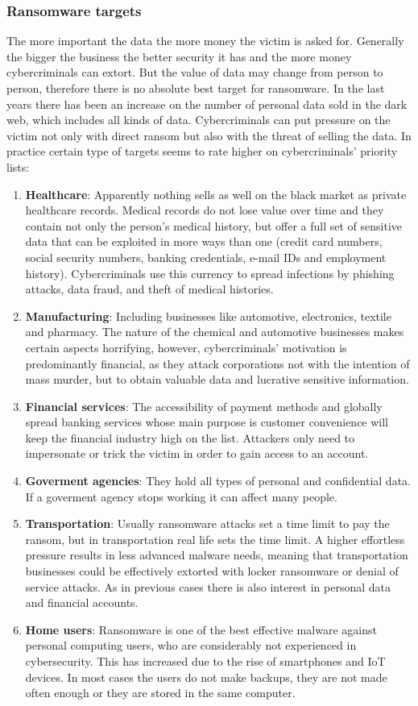 \subsubsection{Ransomware targets}
The more important the data the more money the victim is asked for.
Generally the bigger the business the better security it has and the more money cybercriminals can extort.
\linej
But the value of data may change from person to person, therefore there is no absolute best target for ransomware.
In the last years there has been an increase on the number of personal data sold in the dark web, which includes all kinds of data.
Cybercriminals can put pressure on the victim not only with direct ransom but also with the threat of selling the data.
\linej
In practice certain type of targets seems to rate higher on cybercriminals' priority lists\cite{ransomware_digital_extortion}:
\begin{enumerate}
	\item \textbf{Healthcare}: Apparently nothing sells as well on the black market as private healthcare records.
		Medical records do not lose value over time and they contain not only the person's medical history, but offer a full set of sensitive data that can be exploited in more ways than one (credit card numbers, social security numbers, banking credentials, e-mail IDs and employment history).
Cybercriminals use this currency to spread infections by phishing attacks, data fraud, and theft of medical histories.
	\item \textbf{Manufacturing}: Including businesses like automotive, electronics, textile and pharmacy.
The nature of the chemical and automotive businesses makes certain aspects horrifying, however, cybercriminals' motivation is predominantly financial, as they attack corporations not with the intention of mass murder, but to obtain valuable data and lucrative sensitive information.
	\item \textbf{Financial services}: The accessibility of payment methods and globally spread banking services whose main purpose is customer convenience will keep the financial industry high on the list. Attackers only need to impersonate or trick the victim in order to gain access to an account.
	\item \textbf{Goverment agencies}: They hold all types of personal and confidential data. If a goverment agency stops working it can affect many people.
	\item \textbf{Transportation}: Usually ransomware attacks set a time limit to pay the ransom, but in transportation real life sets the time limit. A higher effortless pressure results in less advanced malware needs, meaning that transportation businesses could be effectively extorted with locker ransomware or denial of service attacks.
As in previous cases there is also interest in personal data and financial accounts.
	\item \textbf{Home users}: Ransomware is one of the best effective malware against personal computing users, who are considerably not experienced in cybersecurity.
This has increased due to the rise of smartphones and IoT devices.
In most cases the users do not make backups, they are not made often enough or they are stored in the same computer.
\end{enumerate}
